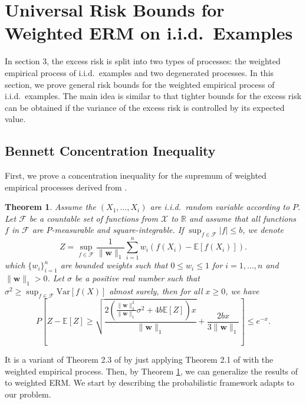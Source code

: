 \documentclass[letterpaper]{article} %
\newtheorem{theorem}{Theorem}
\newcommand{\E}{\mathbb{E}}
\newcommand{\Pro}{P}
\newcommand{\Var}{\text{Var}}
\newcommand{\weight}{\mathbf{w}}
\newcommand{\normo}[1]{\|#1\|_1}
\begin{document}
\section{Universal Risk Bounds for Weighted ERM on i.i.d.\ Examples} %
\label{sec:weighted_risk_bounds}

In section 3, the excess risk is split into two types of processes: the weighted empirical process of i.i.d.\ examples and two degenerated processes.
In this section, we prove general risk bounds for the weighted empirical process of i.i.d.\ examples. 
The main idea is similar to \cite{Massart2006} that tighter bounds for the excess risk can be obtained if the variance of the excess risk is controlled by its expected value.

\subsection{Bennett Concentration Inequality} %
\label{subsub:bennett_type_inequality}


First, we prove a concentration inequality for the supremum of weighted empirical processes derived from \cite{Bousquet2002a}.

\begin{theorem}
    \label{th:weighted_bennett_inequality}
    Assume the $(X_1,\dots,X_i)$ are i.i.d.\ random variable according to $P$. Let $\mathcal F$ be a countable set of functions from $\mathcal X$ to $\mathbb R$ and assume that all functions $f$ in $\mathcal F$ are $P$-measurable and square-integrable. If $\sup_{f\in\mathcal F} |f| \le b$, we denote
    \[Z = \sup_{f\in \mathcal F} \frac{1}{\normo{\weight{}}}\sum_{i=1}^n w_i (f(X_i)-\E[f(X_i)]).\]
    which $\{w_i\}_{i=1}^n$ are bounded weights such that $0\le w_i\le 1$ for $i=1,\dots,n$ and $\normo{\weight{}}>0$.
    Let $\sigma$ be a positive real number such that $\sigma^2\ge \sup_{f\in\mathcal F} \Var[f(X)]$ almost surely, then for all $x\ge 0$, we have
    \begin{equation}
        \label{eq:weighted_bennett_inequality}
            \Pro\left[Z-\E[Z] \ge \sqrt{\frac{2(\frac{\|\weight{}\|_2^2}{\normo{\weight{}}}\sigma^2+4b\E[Z])x}{\normo{\weight{}}}} + \frac{2bx}{3\normo{\weight{}}}\right] \le e^{-x}.
    \end{equation}
\end{theorem}

It is a variant of Theorem 2.3 of \cite{Bousquet2002a} by just applying Theorem 2.1 of \cite{Bousquet2002a} with the weighted empirical process.
Then, by Theorem \ref{th:weighted_bennett_inequality}, we can generalize the results of \cite{Massart2006} to weighted ERM. We start by describing the probabilistic framework adapts to our problem.
\end{document}
